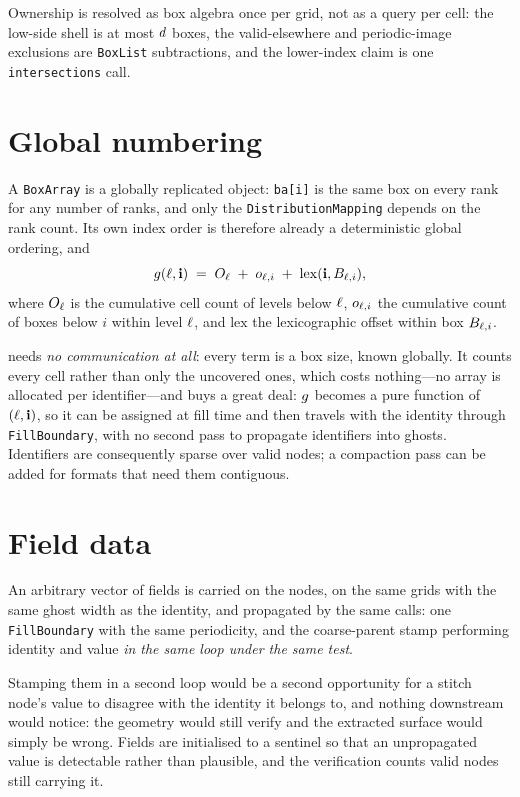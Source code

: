 Ownership is resolved as box algebra once per grid, not as a query per cell: the
low-side shell is at most $d$ boxes, the valid-elsewhere and periodic-image
exclusions are \texttt{BoxList} subtractions, and the lower-index claim is one
\texttt{intersections} call.

\section{Global numbering}
\label{sec:numbering}

A \texttt{BoxArray} is a globally replicated object: \texttt{ba[i]} is the same
box on every rank for any number of ranks, and only the
\texttt{DistributionMapping} depends on the rank count. Its own index order is
therefore already a deterministic global ordering, and
\begin{equation}
  g(\ell,\mathbf{i}) \;=\; O_{\ell} \;+\; o_{\ell,i} \;+\; \mathrm{lex}(\mathbf{i}, B_{\ell,i}),
  \label{eq:gid}
\end{equation}
where $O_{\ell}$ is the cumulative cell count of levels below $\ell$,
$o_{\ell,i}$ the cumulative count of boxes below $i$ within level $\ell$, and
$\mathrm{lex}$ the lexicographic offset within box $B_{\ell,i}$.

 needs \emph{no communication at all}: every term is a box size,
known globally. It counts every cell rather than only the uncovered ones, which
costs nothing---no array is allocated per identifier---and buys a great deal:
$g$ becomes a pure function of $(\ell,\mathbf{i})$, so it can be assigned at fill
time and then travels with the identity through \texttt{FillBoundary}, with no
second pass to propagate identifiers into ghosts. Identifiers are consequently
sparse over valid nodes; a compaction pass can be added for formats that need
them contiguous.

\section{Field data}
\label{sec:fields}

An arbitrary vector of fields is carried on the nodes, on the same grids with
the same ghost width as the identity, and propagated by the same calls: one
\texttt{FillBoundary} with the same periodicity, and the coarse-parent stamp
performing identity and value \emph{in the same loop under the same test}.

Stamping them in a second loop would be a second opportunity for a stitch
node's value to disagree with the identity it belongs to, and nothing
downstream would notice: the geometry would still verify and the extracted
surface would simply be wrong. Fields are initialised to a sentinel so that an
unpropagated value is detectable rather than plausible, and the verification
counts valid nodes still carrying it.

